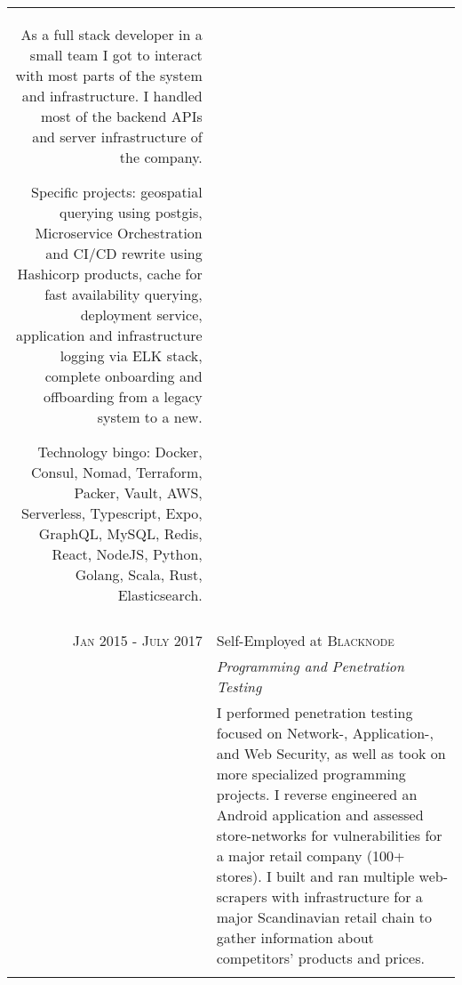 \documentclass[a4paper,10pt]{article}
\begin{document}
\begin{tabular}{r|p{11cm}}
{ As a full stack developer in a small team I got to interact with most parts of the system and infrastructure. I handled most of the backend APIs
 and server infrastructure of the company.
 
 Specific projects: geospatial querying using postgis, Microservice Orchestration and CI/CD rewrite using Hashicorp products, 
 cache for fast availability querying, deployment service, application and infrastructure logging via ELK stack, complete onboarding and offboarding
 from a legacy system to a new.
 
 Technology bingo: Docker, Consul, Nomad, Terraform, Packer, Vault, AWS, Serverless, Typescript, Expo, GraphQL, MySQL, 
 Redis, React, NodeJS, Python, Golang, Scala, Rust, Elasticsearch.}\\ \multicolumn{2}{c}{} \\



 \textsc{Jan 2015 - July 2017} & Self-Employed at \textsc{Blacknode} \\
 &\emph{Programming and Penetration Testing}\\
 &\footnotesize{I performed penetration testing focused on Network-, Application-, and Web Security, as well as took
 on more specialized programming projects. I reverse engineered an Android application and assessed store-networks
 for vulnerabilities for a major retail company (100+ stores). I built and ran multiple web-scrapers with infrastructure 
 for a major Scandinavian retail chain to gather information about competitors' products and prices.}\\\multicolumn{2}{c}{} \\
 
\end{tabular}
\end{document}

